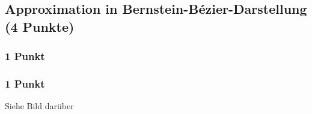 \newif\ifvimbug
\vimbugfalse

\ifvimbug

\fi


\subsection{Approximation in Bernstein-Bézier-Darstellung (4 Punkte)}
\subsubsection{1 Punkt}
\begin{center}
\end{center}
\subsubsection{1 Punkt}
Siehe Bild darüber
